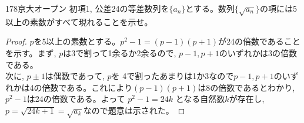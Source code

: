 \begin{thm}{178}{}{京大オープン}
 初項1, 公差24の等差数列を$\{a_n\}$とする。数列$\{\sqrt{a_n}\}$の項には5以上の素数がすべて現れることを示せ。
\end{thm}

\begin{proof}

$p$を5以上の素数とする。$p^2-1=(p-1)(p+1)$が24の倍数であることを示す。まず, $p$は3で割って1余るか2余るので, $p-1,p+1$のいずれかは3の倍数である。\\
次に, $p\pm 1$は偶数であって, $p$を
4で割ったあまりは1か3なので$p-1,p+1$のいずれかは4の倍数である。これにより$(p-1)(p+1)$は8の倍数であるとわかり, $p^2-1$は24の倍数である。よって $p^2-1=24k$  となる自然数$k$が存在し,  $p=\sqrt{24k+1}=\sqrt{a_k}$なので題意は示された。


\end{proof}
